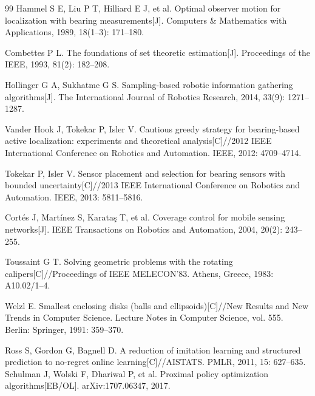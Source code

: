 \clearpage
{
\begin{thebibliography}{99}
  Hammel S E, Liu P T, Hilliard E J, et al. Optimal observer motion for localization with bearing measurements[J]. Computers \& Mathematics with Applications, 1989, 18(1--3): 171--180.

  Combettes P L. The foundations of set theoretic estimation[J]. Proceedings of the IEEE, 1993, 81(2): 182--208.

  Hollinger G A, Sukhatme G S. Sampling-based robotic information gathering algorithms[J]. The International Journal of Robotics Research, 2014, 33(9): 1271--1287.

  Vander Hook J, Tokekar P, Isler V. Cautious greedy strategy for bearing-based active localization: experiments and theoretical analysis[C]//2012 IEEE International Conference on Robotics and Automation. IEEE, 2012: 4709--4714.

  Tokekar P, Isler V. Sensor placement and selection for bearing sensors with bounded uncertainty[C]//2013 IEEE International Conference on Robotics and Automation. IEEE, 2013: 5811--5816.

  Cort\'es J, Mart\'inez S, Karata\c{s} T, et al. Coverage control for mobile sensing networks[J]. IEEE Transactions on Robotics and Automation, 2004, 20(2): 243--255.

  Toussaint G T. Solving geometric problems with the rotating calipers[C]//Proceedings of IEEE MELECON'83. Athens, Greece, 1983: A10.02/1--4.

  Welzl E. Smallest enclosing disks (balls and ellipsoids)[C]//New Results and New Trends in Computer Science. Lecture Notes in Computer Science, vol. 555. Berlin: Springer, 1991: 359--370.

   Ross S, Gordon G, Bagnell D. A reduction of imitation learning and structured prediction to no-regret online learning[C]//AISTATS. PMLR, 2011, 15: 627--635.
   Schulman J, Wolski F, Dhariwal P, et al. Proximal policy optimization algorithms[EB/OL]. arXiv:1707.06347, 2017.
\end{thebibliography}
}
